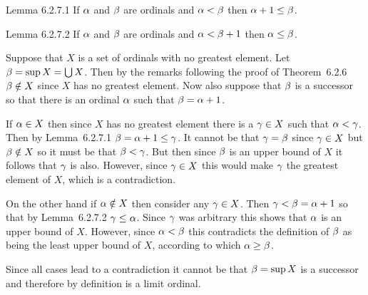 \begin{solution}

    \begin{statement}{Lemma 6.2.7.1}
        If $\alpha$ and $\beta$ are ordinals and $\alpha < \beta$ then $\alpha+1 \leq \beta$.
    \end{statement}


    \begin{statement}{Lemma 6.2.7.2}
        If $\alpha$ and $\beta$ are ordinals and $\alpha < \beta+1$ then $\alpha \leq \beta$.
    \end{statement}


    \mainprob
    
    Suppose that $X$ is a set of ordinals with no greatest element.
    Let $\beta = \sup{X} = \bigcup X$.
    Then by the remarks following the proof of Theorem~6.2.6 $\beta \notin X$ since $X$ has no greatest element.
    Now also suppose that $\beta$ is a successor so that there is an ordinal $\alpha$ such that $\beta = \alpha+1$.

    If $\alpha \in X$ then since $X$ has no greatest element there is a $\gamma \in X$ such that $\alpha < \gamma$.
    Then by Lemma~6.2.7.1 $\beta = \alpha + 1 \leq \gamma$.
    It cannot be that $\gamma = \beta$ since $\gamma \in X$ but $\beta \notin X$ so it must be that $\beta < \gamma$.
    But then since $\beta$ is an upper bound of $X$ it follows that $\gamma$ is also.
    However, since $\gamma \in X$ this would make $\gamma$ the greatest element of $X$, which is a contradiction.

    On the other hand if $\alpha \notin X$ then consider any $\gamma \in X$.
    Then $\gamma < \beta = \alpha+1$ so that by Lemma~6.2.7.2 $\gamma \leq \alpha$.
    Since $\gamma$ was arbitrary this shows that $\alpha$ is an upper bound of $X$.
    However, since $\alpha < \beta$ this contradicts the definition of $\beta$ as being the least upper bound of $X$, according to which $\alpha \geq \beta$.

    Since all cases lead to a contradiction it cannot be that $\beta = \sup{X}$ is a successor and therefore by definition is a limit ordinal. \qedsymbol
\end{solution}

